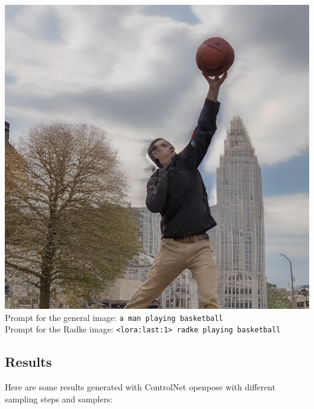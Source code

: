 \documentclass{article}
\begin{document}
\begin{center}
    \includegraphics[scale=0.2]{.imgs/radke_lora_v1.5_(2)_prompting_basketball_1.png}\\
    Prompt for the general image: \verb|a man playing basketball| \\
    Prompt for the Radke image: \verb|<lora:last:1> radke playing basketball|
\end{center}

\newpage
\subsection{Results}

Here are some results generated with ControlNet openpose with different sampling steps and samplers:
\end{document}
